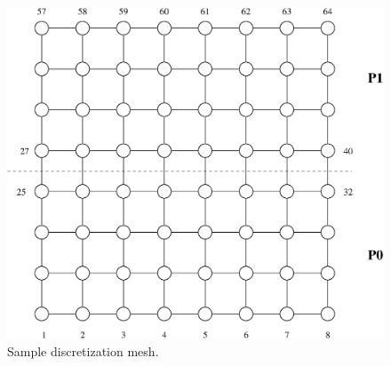 \begin{figure}[h] 
\begin{center}
\ifcase\pdfoutput
\includegraphics[scale=0.45]{figures/try8x8.eps}
\or
{}
\fi
\end{center}
\caption{Sample discretization mesh.\label{fig:try8x8}}
\end{figure}

